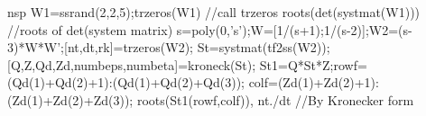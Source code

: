 \begin{examples}
  \begin{mintednsp}{nsp}
    W1=ssrand(2,2,5);trzeros(W1)    //call trzeros
    roots(det(systmat(W1)))         //roots of det(system matrix)
    s=poly(0,'s');W=[1/(s+1);1/(s-2)];W2=(s-3)*W*W';[nt,dt,rk]=trzeros(W2);
    St=systmat(tf2ss(W2));[Q,Z,Qd,Zd,numbeps,numbeta]=kroneck(St);
    St1=Q*St*Z;rowf=(Qd(1)+Qd(2)+1):(Qd(1)+Qd(2)+Qd(3));
    colf=(Zd(1)+Zd(2)+1):(Zd(1)+Zd(2)+Zd(3));
    roots(St1(rowf,colf)), nt./dt     //By Kronecker form
  \end{mintednsp}
\end{examples}
\begin{manseealso}
     
\end{manseealso}
